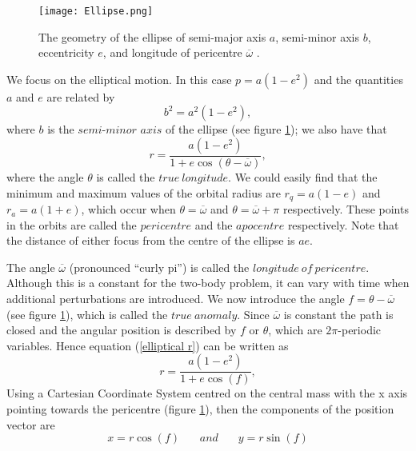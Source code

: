 \begin{figure}
    \texttt{[image: Ellipse.png]}
    \caption{The geometry of the ellipse of semi-major axis $a$, semi-minor axis $b$, eccentricity $e$, and longitude of pericentre $\overline{\omega}$ .}
    \label{fig:ellipse}
\end{figure}

We focus on the elliptical motion. In this case $p = a(1-e^2)$ and the quantities $a$ and $e$ are related by
\begin{equation}
    b^2 = a^2 (1-e^2),
    \label{b a e relation}
    \tag{59}
\end{equation}
where $b$ is the $\textit{semi-minor axis}$ of the ellipse (see figure \ref{fig:ellipse}); we also have that
\begin{equation}
    r = \frac{a(1 - e^2)}{1 + e \cos(\theta - \overline{\omega})},
    \label{elliptical r}
    \tag{60}
\end{equation}
where the angle $\theta$ is called the $true ~longitude$. We could easily find that the minimum and maximum values of the orbital radius are $r_q = a(1-e)$ and $r_a = a(1+e)$, which occur when $\theta = \overline{\omega}$ and $\theta = \overline{\omega} + \pi$ respectively. These points in the orbits are called the $pericentre$ and the $apocentre$ respectively. Note that the distance of either focus from the centre of the ellipse is $ae$.

The angle $\overline{\omega}$ (pronounced “curly pi”) is called the $longitude ~of ~pericentre$. Although this is a constant for the two-body problem, it can vary with time when additional perturbations are introduced. We now introduce the angle $f = \theta - \overline{\omega}$ (see figure \ref{fig:ellipse}), which is called the $true ~anomaly$. Since $\overline{\omega}$ is constant the path is closed and the angular position is described by $f$ or $\theta$, which are $2\pi$-periodic variables. Hence equation (\ref{elliptical r}) can be written as
\begin{equation}
    r = \frac{a(1 - e^2)}{1 + e \cos(f)},
    \tag{61}
\end{equation}
Using a Cartesian Coordinate System centred on the central mass with the x axis pointing towards the pericentre (figure \ref{fig:ellipse}), then the components of the position vector are
\begin{equation}
    x = r \cos(f) ~~~~~~~~and~~~~~~~~ y = r \sin(f)
    \tag{62}
\end{equation}

